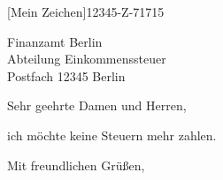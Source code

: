 \documentclass[12pt,ngerman]{scrlttr2}
\begin{document}
[Mein Zeichen]{12345-Z-71715}


\begin{letter}{Finanzamt Berlin \\ Abteilung Einkommenssteuer \\ Postfach 12345 Berlin }

\opening{Sehr geehrte Damen und Herren,}

ich möchte keine Steuern mehr zahlen.

\closing{Mit freundlichen Grüßen,}
\end{letter}
\end{document}
